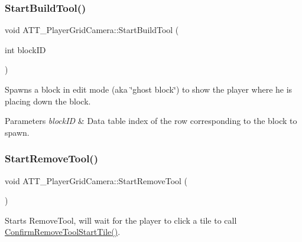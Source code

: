 \subsubsection{\texorpdfstring{StartBuildTool()}{StartBuildTool()}}
{\footnotesize\ttfamily void A\+T\+T\+\_\+\+Player\+Grid\+Camera\+::\+Start\+Build\+Tool (\begin{DoxyParamCaption}\item[{int}]{block\+ID }\end{DoxyParamCaption})\hspace{0.3cm}{\ttfamily [protected]}}



Spawns a block in edit mode (aka \char`\"{}ghost block\char`\"{}) to show the player where he is placing down the block. 


\begin{DoxyParams}{Parameters}
{\em block\+ID} & Data table index of the row corresponding to the block to spawn. \\
\hline
\end{DoxyParams}
\mbox{\label{class_a_t_t___player_grid_camera_aa5e54106a559060b452e8f39ac2b83c4}} 
\subsubsection{\texorpdfstring{StartRemoveTool()}{StartRemoveTool()}}
{\footnotesize\ttfamily void A\+T\+T\+\_\+\+Player\+Grid\+Camera\+::\+Start\+Remove\+Tool (\begin{DoxyParamCaption}{ }\end{DoxyParamCaption})\hspace{0.3cm}{\ttfamily [protected]}}



Starts Remove\+Tool, will wait for the player to click a tile to call \mbox{\hyperlink{class_a_t_t___player_grid_camera_aec01f397402202fb08dea3a659256baa}{Confirm\+Remove\+Tool\+Start\+Tile()}}. 

\mbox{\label{class_a_t_t___player_grid_camera_aeab5a8ae1220466c3bd63d96cab019b4}} 
